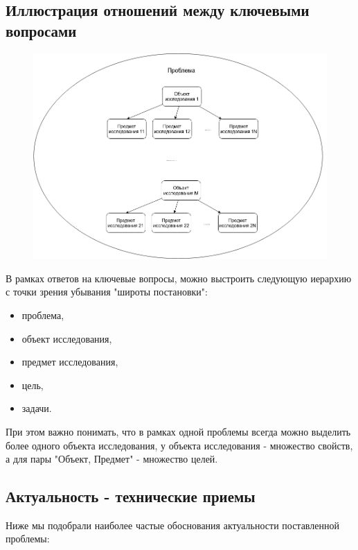 \documentclass{report}
\begin{document}
\subsection{Иллюстрация отношений между ключевыми вопросами}

\begin{figure}[H]
	\centering
	\includegraphics[width=13cm]{otnoshenie}
\end{figure}
В рамках ответов на ключевые вопросы, можно выстроить следующую иерархию с точки зрения убывания "широты постановки":

\begin{itemize}
	\item проблема,
	\item объект исследования,
	\item предмет исследования,
	\item цель,
	\item задачи.
\end{itemize}
При этом важно понимать, что в рамках одной проблемы всегда можно выделить более одного объекта исследования, у объекта исследования - множество свойств, а для пары "Объект, Предмет" - множество целей.

\subsection{Актуальность - технические приемы}
Ниже мы подобрали наиболее частые обоснования актуальности поставленной проблемы:
\end{document}
